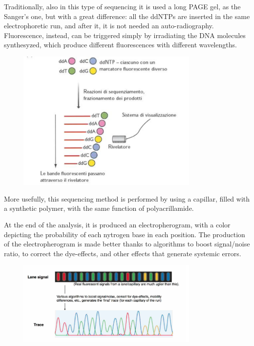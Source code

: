 Traditionally, also in this type of sequencing it is used a long PAGE gel, as the Sanger's one, but with a great difference: all the ddNTPs are inserted in the same electrophoretic run, and after it, it is not needed an auto-radiography. Fluorescence, instead, can be triggered simply by irradiating the DNA molecules synthesyzed, which produce different fluorescences with different wavelengths.

\begin{figure}[h]
\caption{}
\centering
\includegraphics[width=0.8\textwidth]{automaticSang}
\label{}
\end{figure}


More usefully, this sequencing method is performed by using a capillar, filled with a synthetic polymer, with the same function of polyacrillamide. 

At the end of the analysis, it is produced an electropherogram, with a color depicting the probability of each nytrogen base in each position. The production of the electropherogram is made better thanks to algorithms to boost signal/noise ratio, to correct the dye-effects, and other effects that generate systemic errors. %

\begin{figure}[h]
\caption{}
\centering
\includegraphics[width=0.8\textwidth]{elettroferogramma}
\label{}
\end{figure}

